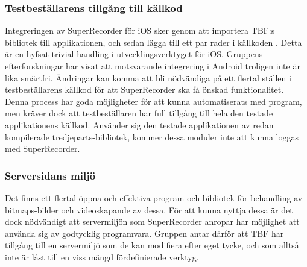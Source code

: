 \subsubsection{Testbeställarens tillgång till källkod}
Integreringen av SuperRecorder för iOS sker genom att importera TBF:s bibliotek till applikationen, och sedan lägga till ett par rader i källkoden \parencite{superrec}. Detta är en hyfsat trivial handling i utvecklingsverktyget för iOS. Gruppens efterforskningar har visat att motsvarande integrering i Android troligen inte är lika smärtfri. Ändringar kan komma att bli nödvändiga på ett flertal ställen i testbeställarens källkod för att SuperRecorder ska få önskad funktionalitet. Denna process har goda möjligheter för att kunna automatiserats med program, men kräver dock att testbeställaren har full tillgång till hela den testade applikationens källkod. Använder sig den testade applikationen av redan kompilerade tredjeparts-bibliotek, kommer dessa moduler inte att kunna loggas med SuperRecorder.

\subsubsection{Serversidans miljö}
Det finns ett flertal öppna och effektiva program och bibliotek för behandling av bitmaps-bilder och videoskapande av dessa. För att kunna nyttja dessa är det dock nödvändigt att servermiljön som SuperRecorder anropar har möjlighet att använda sig av godtycklig programvara. Gruppen antar därför att TBF har tillgång till en servermiljö som de kan modifiera efter eget tycke, och som alltså inte är låst till en viss mängd fördefinierade verktyg.
